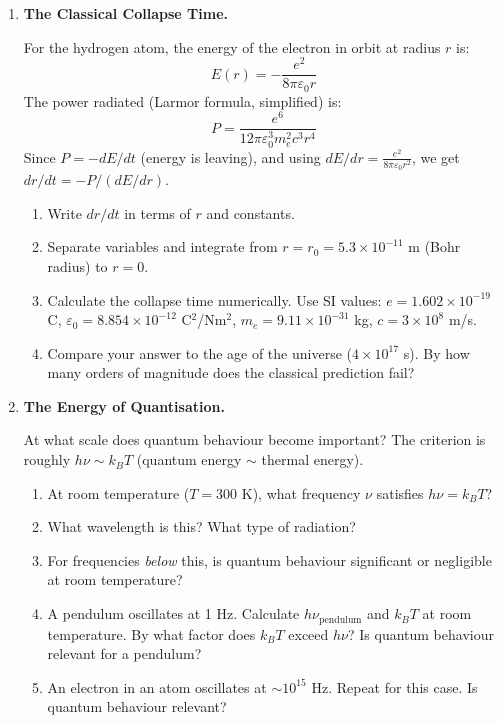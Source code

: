 \documentclass[12pt, a4paper]{book}
\begin{document}
\begin{deepbox}
\begin{enumerate}[label=\textbf{D\arabic*.}]

  \item \textbf{The Classical Collapse Time.}

        For the hydrogen atom, the energy of the electron
        in orbit at radius $r$ is:
        \[
          E(r) = -\frac{e^2}{8\pi\varepsilon_0 r}
        \]
        The power radiated (Larmor formula, simplified) is:
        \[
          P = \frac{e^6}{12\pi\varepsilon_0^3 m_e^2 c^3 r^4}
        \]
        Since $P = -dE/dt$ (energy is leaving), and using
        $dE/dr = \frac{e^2}{8\pi\varepsilon_0 r^2}$,
        we get $dr/dt = -P/(dE/dr)$.

        \begin{enumerate}[label=(\alph*)]
          \item Write $dr/dt$ in terms of $r$ and constants.
          \item Separate variables and integrate from
                $r = r_0 = 5.3\times10^{-11}$ m (Bohr radius)
                to $r = 0$.
          \item Calculate the collapse time numerically.
                Use SI values:
                $e = 1.602\times10^{-19}$ C,
                $\varepsilon_0 = 8.854\times10^{-12}$ C$^2$/Nm$^2$,
                $m_e = 9.11\times10^{-31}$ kg,
                $c = 3\times10^8$ m/s.
          \item Compare your answer to the age of the universe
                ($4\times10^{17}$ s). By how many orders of
                magnitude does the classical prediction fail?
        \end{enumerate}

  \item \textbf{The Energy of Quantisation.}

        At what scale does quantum behaviour become important?
        The criterion is roughly $h\nu \sim k_BT$
        (quantum energy $\sim$ thermal energy).

        \begin{enumerate}[label=(\alph*)]
          \item At room temperature ($T = 300$ K),
                what frequency $\nu$ satisfies $h\nu = k_BT$?
          \item What wavelength is this? What type of radiation?
          \item For frequencies \emph{below} this, is
                quantum behaviour significant or negligible
                at room temperature?
          \item A pendulum oscillates at 1 Hz.
                Calculate $h\nu_\text{pendulum}$ and $k_BT$
                at room temperature.
                By what factor does $k_BT$ exceed $h\nu$?
                Is quantum behaviour relevant for a pendulum?
          \item An electron in an atom oscillates at
                $\sim 10^{15}$ Hz.
                Repeat for this case.
                Is quantum behaviour relevant?
        \end{enumerate}


\end{enumerate}
\end{deepbox}
\end{document}
